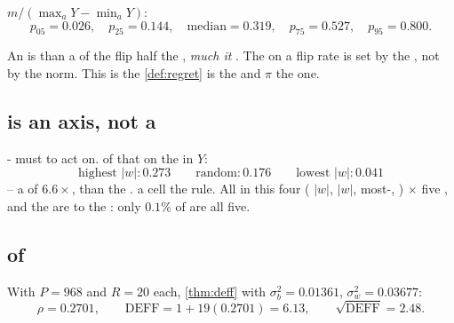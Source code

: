    $m/(\max_a Y - \min_a Y)$:
\[
p_{05}=0.026,\quad p_{25}=0.144,\quad \text{median}=0.319,\quad p_{75}=0.527,\quad p_{95}=0.800.
\]

\begin{corollary}
An    is  than  a  of the  
 flip half the , \emph{ much   it }.
The  on a flip rate is set by the  , not by the norm.
This is the   \cref{def:regret} is the   and $\pi$ the
 one.
\end{corollary}

\subsection{  is an axis, not a }
\label{rem:target}

 -  must  \emph{}  to act on.
  of that  on the   in $Y$:
\[
\text{highest }|w|: 0.273 \qquad \text{random}: 0.176 \qquad \text{lowest }|w|: 0.041
\]
-- a  of $6.6\times$,  than the   .  a
 cell    the  rule. All  in this 
 four   ( $|w|$,  $|w|$, most-, )
$\times$ five , and the  are  to  the : only $0.1\%$
of  are   all five.

\subsection{ of  }

With $P=968$  and $R=20$  each, \cref{thm:deff}  with 
$\sigma_b^2 = 0.01361$, $\sigma_w^2 = 0.03677$:
\[
\rho = 0.2701, \qquad \mathrm{DEFF} = 1+19(0.2701) = 6.13, \qquad \sqrt{\mathrm{DEFF}} = 2.48 .
\]

